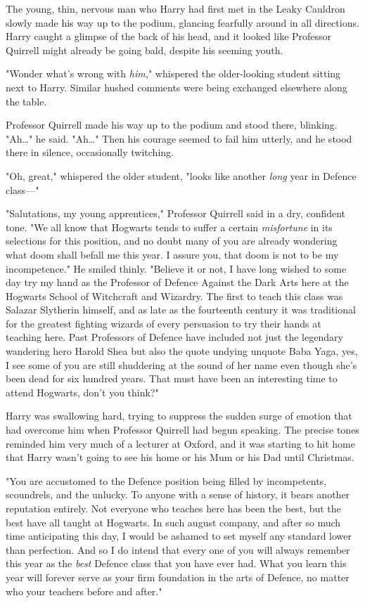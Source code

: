 The young, thin, nervous man who Harry had first met in the Leaky Cauldron
slowly made his way up to the podium, glancing fearfully around in all
directions. Harry caught a glimpse of the back of his head, and it looked like
Professor Quirrell might already be going bald, despite his seeming youth.

"Wonder what's wrong with \emph{him,}" whispered the older-looking student
sitting next to Harry. Similar hushed comments were being exchanged elsewhere
along the table.

Professor Quirrell made his way up to the podium and stood there, blinking.
"Ah{\ldots}" he said. "Ah{\ldots}" Then his courage seemed to fail him utterly,
and he stood there in silence, occasionally twitching.

"Oh, great," whispered the older student, "looks like another \emph{long} year
in Defence class---"

"Salutations, my young apprentices," Professor Quirrell said in a dry,
confident tone. "We all know that Hogwarts tends to suffer a certain
\emph{misfortune} in its selections for this position, and no doubt many of you
are already wondering what doom shall befall me this year. I assure you, that
doom is not to be my incompetence." He smiled thinly. "Believe it or not, I
have long wished to some day try my hand as the Professor of Defence Against the
Dark Arts here at the Hogwarts School of Witchcraft and Wizardry. The first to
teach this class was Salazar Slytherin himself, and as late as the fourteenth
century it was traditional for the greatest fighting wizards of every
persuasion to try their hands at teaching here. Past Professors of Defence have
included not just the legendary wandering hero Harold Shea but also the quote
undying unquote Baba Yaga, yes, I see some of you are still shuddering at the
sound of her name even though she's been dead for six hundred years. That must
have been an interesting time to attend Hogwarts, don't you think?"

Harry was swallowing hard, trying to suppress the sudden surge of emotion that
had overcome him when Professor Quirrell had begun speaking. The precise tones
reminded him very much of a lecturer at Oxford, and it was starting to hit home
that Harry wasn't going to see his home or his Mum or his Dad until Christmas.

"You are accustomed to the Defence position being filled by incompetents,
scoundrels, and the unlucky. To anyone with a sense of history, it bears
another reputation entirely. Not everyone who teaches here has been the best,
but the best have all taught at Hogwarts. In such august company, and after so
much time anticipating this day, I would be ashamed to set myself any standard
lower than perfection. And so I do intend that every one of you will always
remember this year as the \emph{best} Defence class that you have ever had.
What you learn this year will forever serve as your firm foundation in the arts
of Defence, no matter who your teachers before and after."

